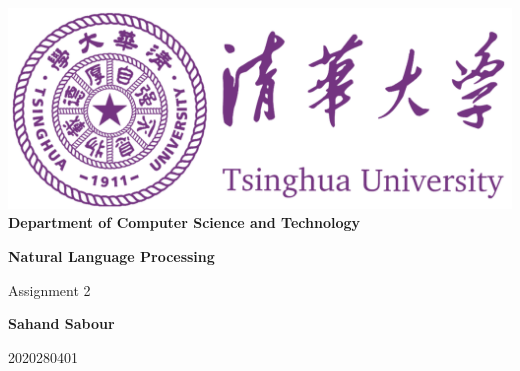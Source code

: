 \documentclass[12pt,a4paper]{article}
\begin{document}
	\begin{titlepage}
		\begin{center}
			\includegraphics[scale=.4]{Figures/Cover}\\
			\vspace{1cm}
			\bf{ \large {Department of Computer Science and Technology} }
		\end{center}
		
		\vspace{4cm}
		\centering
		\textbf{\Huge Natural Language Processing}
		\vspace{.5cm}
		
		{\Large Assignment 2}

		\vspace{4cm}
		
		\textbf{\LARGE Sahand Sabour}
		
		
		
		\vspace{0.5cm}
		
		{\large 2020280401}
		
		
		\vfill
		
	\end{titlepage}
\end{document}
